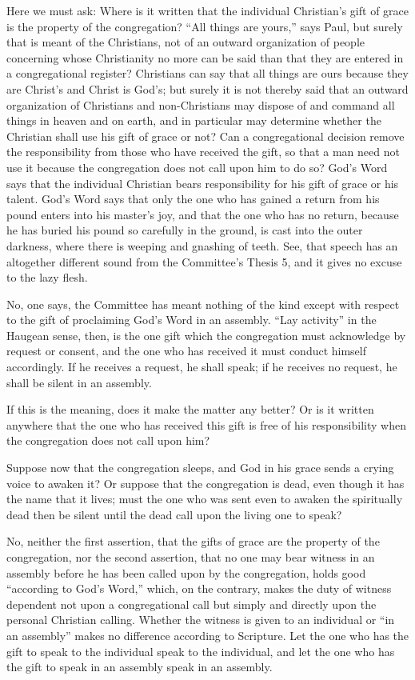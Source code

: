Here we must ask: Where is it written that the individual Christian’s gift of grace is the property of the congregation? “All things are yours,” says Paul, but surely that is meant of the Christians, not of an outward organization of people concerning whose Christianity no more can be said than that they are entered in a congregational register? Christians can say that all things are ours because they are Christ’s and Christ is God’s; but surely it is not thereby said that an outward organization of Christians and non-Christians may dispose of and command all things in heaven and on earth, and in particular may determine whether the Christian shall use his gift of grace or not? Can a congregational decision remove the responsibility from those who have received the gift, so that a man need not use it because the congregation does not call upon him to do so? God’s Word says that the individual Christian bears responsibility for his gift of grace or his talent. God’s Word says that only the one who has gained a return from his pound enters into his master’s joy, and that the one who has no return, because he has buried his pound so carefully in the ground, is cast into the outer darkness, where there is weeping and gnashing of teeth. See, that speech has an altogether different sound from the Committee’s Thesis 5, and it gives no excuse to the lazy flesh.

No, one says, the Committee has meant nothing of the kind except with respect to the gift of proclaiming God’s Word in an assembly. “Lay activity” in the Haugean sense, then, is the one gift which the congregation must acknowledge by request or consent, and the one who has received it must conduct himself accordingly. If he receives a request, he shall speak; if he receives no request, he shall be silent in an assembly.

If this is the meaning, does it make the matter any better? Or is it written anywhere that the one who has received this gift is free of his responsibility when the congregation does not call upon him?

Suppose now that the congregation sleeps, and God in his grace sends a crying voice to awaken it? Or suppose that the congregation is dead, even though it has the name that it lives; must the one who was sent even to awaken the spiritually dead then be silent until the dead call upon the living one to speak?

No, neither the first assertion, that the gifts of grace are the property of the congregation, nor the second assertion, that no one may bear witness in an assembly before he has been called upon by the congregation, holds good “according to God’s Word,” which, on the contrary, makes the duty of witness dependent not upon a congregational call but simply and directly upon the personal Christian calling. Whether the witness is given to an individual or “in an assembly” makes no difference according to Scripture. Let the one who has the gift to speak to the individual speak to the individual, and let the one who has the gift to speak in an assembly speak in an assembly.

